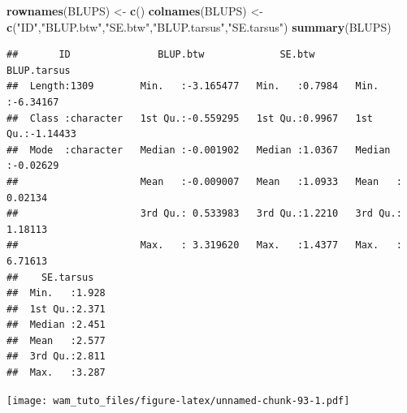 \documentclass[
  12pt,
]{book}
\newenvironment{Shaded}{\begin{snugshade}}{\end{snugshade}}
\newcommand{\CommentTok}[1]{\textcolor[rgb]{0.56,0.35,0.01}{\textit{#1}}}
\newcommand{\DataTypeTok}[1]{\textcolor[rgb]{0.13,0.29,0.53}{#1}}
\newcommand{\DecValTok}[1]{\textcolor[rgb]{0.00,0.00,0.81}{#1}}
\newcommand{\KeywordTok}[1]{\textcolor[rgb]{0.13,0.29,0.53}{\textbf{#1}}}
\newcommand{\NormalTok}[1]{#1}
\newcommand{\OperatorTok}[1]{\textcolor[rgb]{0.81,0.36,0.00}{\textbf{#1}}}
\newcommand{\StringTok}[1]{\textcolor[rgb]{0.31,0.60,0.02}{#1}}
\begin{document}
\begin{Shaded}
\begin{Highlighting}[]
\KeywordTok{rownames}\NormalTok{(BLUPS) \textless{}{-}}\StringTok{ }\KeywordTok{c}\NormalTok{()}
\KeywordTok{colnames}\NormalTok{(BLUPS) \textless{}{-}}\StringTok{ }\KeywordTok{c}\NormalTok{(}\StringTok{"ID"}\NormalTok{,}\StringTok{"BLUP.btw"}\NormalTok{,}\StringTok{"SE.btw"}\NormalTok{,}\StringTok{"BLUP.tarsus"}\NormalTok{,}\StringTok{"SE.tarsus"}\NormalTok{)}
\KeywordTok{summary}\NormalTok{(BLUPS)}
\end{Highlighting}
\end{Shaded}

\begin{verbatim}
##       ID               BLUP.btw             SE.btw        BLUP.tarsus      
##  Length:1309        Min.   :-3.165477   Min.   :0.7984   Min.   :-6.34167  
##  Class :character   1st Qu.:-0.559295   1st Qu.:0.9967   1st Qu.:-1.14433  
##  Mode  :character   Median :-0.001902   Median :1.0367   Median :-0.02629  
##                     Mean   :-0.009007   Mean   :1.0933   Mean   : 0.02134  
##                     3rd Qu.: 0.533983   3rd Qu.:1.2210   3rd Qu.: 1.18113  
##                     Max.   : 3.319620   Max.   :1.4377   Max.   : 6.71613  
##    SE.tarsus    
##  Min.   :1.928  
##  1st Qu.:2.371  
##  Median :2.451  
##  Mean   :2.577  
##  3rd Qu.:2.811  
##  Max.   :3.287
\end{verbatim}

\begin{Shaded}
\end{Shaded}

\texttt{[image: wam\_tuto\_files/figure-latex/unnamed-chunk-93-1.pdf]}
\end{document}
